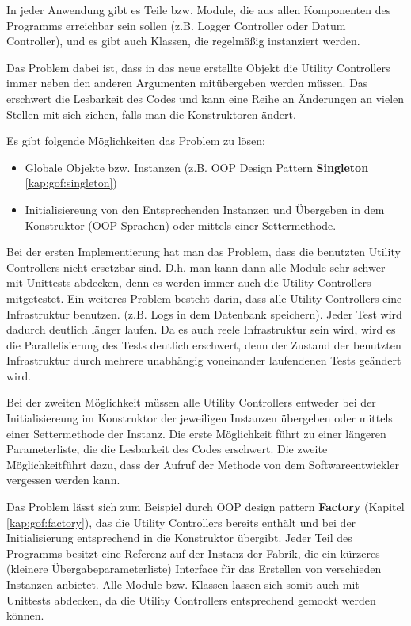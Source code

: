 In jeder Anwendung gibt es Teile bzw. Module, die aus allen Komponenten des Programms erreichbar sein sollen
(z.B. Logger Controller oder Datum Controller), und es gibt auch Klassen, die regelmäßig instanziert werden.

Das Problem dabei ist, dass in das neue erstellte Objekt die Utility Controllers immer neben den anderen Argumenten 
mitübergeben werden müssen. Das erschwert die Lesbarkeit des Codes und kann eine Reihe an Änderungen an vielen Stellen mit sich ziehen,
falls man die Konstruktoren ändert.

Es gibt folgende Möglichkeiten das Problem zu lösen:
\begin{itemize}
    \item Globale Objekte bzw. Instanzen (z.B. OOP Design Pattern \textbf{Singleton} \ref{kap:gof:singleton})
    \item Initialisiereung von den Entsprechenden Instanzen und Übergeben in dem Konstruktor (OOP Sprachen)
    oder mittels einer Settermethode.
\end{itemize}

Bei der ersten Implementierung hat man das Problem, dass die benutzten Utility Controllers nicht ersetzbar sind.
D.h. man kann dann alle Module sehr schwer mit Unittests abdecken, denn es werden immer auch die Utility Controllers mitgetestet.
Ein weiteres Problem besteht darin, dass alle Utility Controllers eine Infrastruktur benutzen.
(z.B. Logs in dem Datenbank speichern). Jeder Test wird dadurch deutlich länger laufen.
Da es auch reele Infrastruktur sein wird, wird es die Parallelisierung des Tests deutlich erschwert, denn 
der Zustand der benutzten Infrastruktur durch mehrere unabhängig voneinander laufendenen Tests geändert wird.

Bei der zweiten Möglichkeit müssen alle Utility Controllers entweder bei der Initialisiereung im Konstruktor 
der jeweiligen Instanzen übergeben oder mittels einer Settermethode der Instanz.
Die erste Möglichkeit führt zu einer längeren Parameterliste, die die Lesbarkeit des Codes erschwert.
Die zweite Möglichkeitführt dazu, dass der Aufruf der Methode von dem Softwareentwickler vergessen werden kann.

Das Problem lässt sich zum Beispiel durch OOP design pattern \textbf{Factory} (Kapitel \ref{kap:gof:factory}), das die Utility Controllers bereits
enthält und bei der Initialisierung entsprechend in die Konstruktor übergibt. 
Jeder Teil des Programms besitzt eine Referenz auf der Instanz der Fabrik, 
die ein kürzeres (kleinere Übergabeparameterliste) Interface für das Erstellen von verschieden Instanzen anbietet.
Alle Module bzw. Klassen lassen sich somit auch mit Unittests
abdecken, da die Utility Controllers entsprechend gemockt werden können. 


